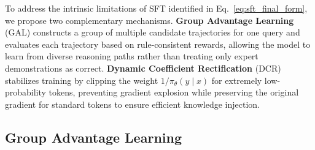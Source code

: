 To address the intrinsic limitations of SFT identified in Eq.~\eqref{eq:sft_final_form}, we propose two complementary mechanisms.
\textbf{Group Advantage Learning} (GAL) constructs a group of multiple candidate trajectories for one query and evaluates each trajectory based on rule-consistent rewards, allowing the model to learn from diverse reasoning paths rather than treating only expert demonstrations as correct.
\textbf{Dynamic Coefficient Rectification} (DCR) stabilizes training by clipping the weight $1/\pi_{\theta}(y\mid x)$ for extremely low-probability tokens, preventing gradient explosion while preserving the original gradient for standard tokens to ensure efficient knowledge injection.


\subsection{Group Advantage Learning}

